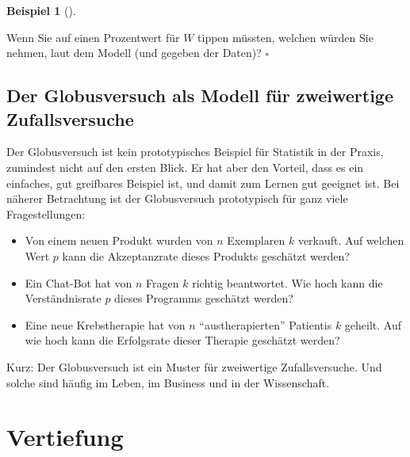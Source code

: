\documentclass[
  ngerman,
  letterpaper,
  twoside,
  open=any]{scrbook}
\providecommand{\tightlist}{%
  \setlength{\itemsep}{0pt}\setlength{\parskip}{0pt}}\usepackage{longtable,booktabs,array}
\theoremstyle{definition}
\newtheorem{example}{Beispiel}[chapter]
\theoremstyle{plain}
\theoremstyle{definition}
\theoremstyle{definition}
\theoremstyle{remark}
\begin{document}
\begin{example}[]
\begin{tcolorbox}[enhanced jigsaw, arc=.35mm, bottomrule=.15mm, bottomtitle=1mm, breakable, colback=white, colbacktitle=quarto-callout-tip-color!10!white, colframe=quarto-callout-tip-color-frame, coltitle=black, left=2mm, leftrule=.75mm, opacityback=0, opacitybacktitle=0.6, rightrule=.15mm, title=\textcolor{quarto-callout-tip-color}{\faLightbulb}\hspace{0.5em}{Tipp}, titlerule=0mm, toprule=.15mm, toptitle=1mm]

Wenn Sie auf einen Prozentwert für \(W\) tippen müssten, welchen würden
Sie nehmen, laut dem Modell (und gegeben der Daten)? \(\square\)

\end{tcolorbox}

\subsection{Der Globusversuch als Modell für zweiwertige
Zufallsversuche}\label{der-globusversuch-als-modell-fuxfcr-zweiwertige-zufallsversuche}

Der Globusversuch ist kein prototypisches Beispiel für Statistik in der
Praxis, zumindest nicht auf den ersten Blick. Er hat aber den Vorteil,
dass es ein einfaches, gut greifbares Beispiel ist, und damit zum Lernen
gut geeignet ist. Bei näherer Betrachtung ist der Globusversuch
prototypisch für ganz viele Fragestellungen:

\begin{itemize}
\tightlist
\item
  Von einem neuen Produkt wurden von \(n\) Exemplaren \(k\) verkauft.
  Auf welchen Wert \(p\) kann die Akzeptanzrate dieses Produkts
  geschätzt werden?
\item
  Ein Chat-Bot hat von \(n\) Fragen \(k\) richtig beantwortet. Wie hoch
  kann die Verständnisrate \(p\) dieses Programms geschätzt werden?
\item
  Eine neue Krebstherapie hat von \(n\) \enquote{austherapierten}
  Patientis \(k\) geheilt. Auf wie hoch kann die Erfolgsrate dieser
  Therapie geschätzt werden?
\end{itemize}

Kurz: Der Globusversuch ist ein Muster für zweiwertige Zufallsversuche.
Und solche sind häufig im Leben, im Business und in der Wissenschaft.

\section{Vertiefung}\label{vertiefung-2}


\end{example}
\end{document}

